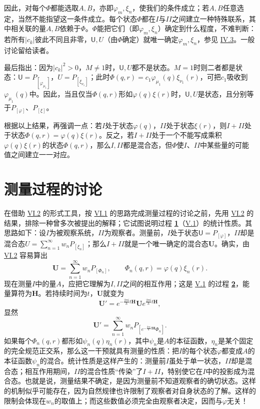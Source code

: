 \documentclass[fontsize=13pt,twoside,openany,headings=normal,parskip=false,bookmarkpackage=false,DIV=calc]{scrbook}
\begin{document}
因此，对每个$\Phi$都能选取$A,\allowbreak B$，亦即$\varphi_m,\allowbreak \xi_n$，使我们的条件成立；若$A,\allowbreak B$任意选定，当然不能指望这一条件成立。每个状态$\Phi$都在$I$与$II$之间建立一种特殊联系，其中相关联的量$A,\allowbreak B$依赖于$\Phi$。$\Phi$能把它们（即$\varphi_m,\allowbreak \xi_n$）确定到什么程度，不难判断：若所有$|c_k|$彼此不同且非零，$\mathsf U,\allowbreak U$（由$\Phi$确定）就唯一确定$\varphi_m,\allowbreak \xi_n$，参见 \hyperref[sec:IV.3]{IV.3}。一般讨论留给读者。

最后指出：因为$|c_k|^2>0$，$M\ne1$时，$\mathsf U,\allowbreak U$都不是状态。$M=1$时则二者都是状态：$\mathsf U=P_{[\varphi_{\mu_1}]}$，$U=P_{[\xi_{\nu_1}]}$；此时$\Phi(q,\allowbreak r)=c_1\varphi_{\mu_1}(q)\xi_{\nu_1}(r)$，可把$c_1$吸收到$\varphi_{\mu_1}(q)$中。因此，当且仅当$\Phi(q,\allowbreak r)$形如$\varphi(q)\xi(r)$时，$\mathsf U,\allowbreak U$是状态，且分别等于$P_{[\varphi]}$、$P_{[\xi]}$。

根据以上结果，再强调一点：若$I$处于状态$\varphi(q)$，$II$处于状态$\xi(r)$，则$I+II$处于状态$\Phi(q,\allowbreak r)=\varphi(q)\xi(r)$。反之，若$I+II$处于一个不能写成乘积$\varphi(q)\xi(r)$的状态$\Phi(q,\allowbreak r)$，那么$I,\allowbreak II$都是混合态，但$\Phi$使$I$、$II$中某些量的可能值之间建立一一对应。

\hypertarget{origpage-233}{}\label{origpage-233}\section{测量过程的讨论}\label{sec:VI.3}
在借助 \hyperref[sec:VI.2]{VI.2} 的形式工具，按 \hyperref[sec:VI.1]{VI.1} 的思路完成测量过程的讨论之前，先用 \hyperref[sec:VI.2]{VI.2} 的结果，排除一种曾多次被提出的解释；它试图说明过程 \hyperref[eq:V.1.1]{\textbf{1}}（\hyperref[sec:V.1]{V.1}）的统计性质。其思路如下：设$I$为被观察系统，$II$为观察者。测量前，$I$处于状态$\mathsf U=P_{[\varphi]}$，$II$却是混合态$U=\sum_{n=1}^{\infty}w_nP_{[\xi_n]}$；那么$I+II$就是一个唯一确定的混合态$\boldsymbol U$。确实，由 \hyperref[sec:VI.2]{VI.2} 容易算出
\[
 \boldsymbol U=\sum_{n=1}^{\infty}w_nP_{[\Phi_n]},\qquad
 \Phi_n(q,r)=\varphi(q)\xi_n(r).
\]
现在测量$I$中的量$A$，应把它理解为$I,\allowbreak II$之间的相互作用；这是 \hyperref[sec:V.1]{V.1} 的过程 \hyperref[eq:V.1.2]{\textbf{2}}，能量算符为$\boldsymbol H$。若持续时间为$t$，$\boldsymbol U$就变为
\[
 \boldsymbol U'=e^{-\frac{2\pi i}{h}t\boldsymbol H}\boldsymbol Ue^{\frac{2\pi i}{h}t\boldsymbol H},
\]
显然
\[
 \boldsymbol U'=\sum_{n=1}^{\infty}w_nP_{[e^{-\frac{2\pi i}{h}t\boldsymbol H}\Phi_n]}.
\]
如果每个$\Phi_n(q,\allowbreak r)$都形如$\psi_n(q)\eta_n(r)$，其中$\psi_n$是$A$的本征函数，$\eta_n$是某个固定的完全规范正交系，那么这一干预就具有测量的性质：把$I$的每个状态$\varphi$都变成$A$的本征函数$\psi_n$的混合。统计性质是这样产生的：测量前$I$虽处于单一状态，$II$却是混合态；相互作用期间，$II$的混合性质“传染”了$I+II$，特别使它在$I$中的投影成为混合态。也就是说，测量结果不确定，是因为测量前不知道观察者的确切状态。这样的机制似乎可能存在，因为自然规律也许限制了观察者对自身状态的了解。这样的限制会体现在$w_n$的取值上；而这些数值必须完全由观察者决定，因而与$\varphi$无关！
\end{document}
